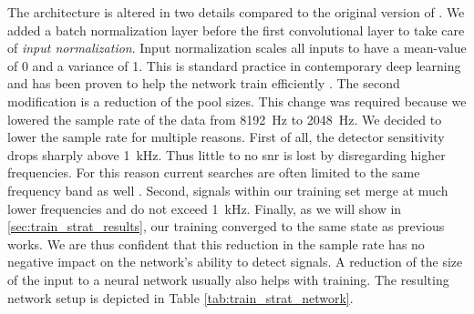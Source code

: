 The architecture is altered in two details compared to the original version of \cite{Gabbard:2017lja}. We added a batch normalization layer before the first convolutional layer to take care of \textit{input normalization}. Input normalization scales all inputs to have a mean-value of 0 and a variance of 1. This is standard practice in contemporary deep learning and has been proven to help the network train efficiently \cite{Ioffe:2015aaa}. The second modification is a reduction of the pool sizes. This change was required because we lowered the sample rate of the data from \SI{8192}{\hertz} to \SI{2048}{\hertz}. We decided to lower the sample rate for multiple reasons. First of all, the detector sensitivity drops sharply above \SI{1}{\kilo\hertz}. Thus little to no \acrshort{snr} is lost by disregarding higher frequencies. For this reason current searches are often limited to the same frequency band as well \cite{Nitz:2018rgo, LIGOScientific:2020lst, LIGOScientific:2015kgh}. Second, signals within our training set merge at much lower frequencies and do not exceed \SI{1}{\kilo\hertz}. Finally, as we will show in \autoref{sec:train_strat_results}, our training converged to the same state as previous works. We are thus confident that this reduction in the sample rate has no negative impact on the network's ability to detect signals. A reduction of the size of the input to a neural network usually also helps with training. The resulting network setup is depicted in Table \ref{tab:train_strat_network}.

